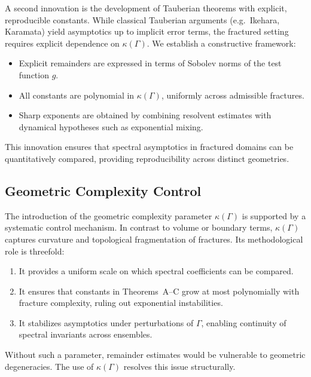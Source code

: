 A second innovation is the development of Tauberian theorems with explicit,
reproducible constants. While classical Tauberian arguments (e.g.\ Ikehara,
Karamata) yield asymptotics up to implicit error terms, the fractured setting
requires explicit dependence on $\kappa(\Gamma)$. We establish a constructive
framework:

\begin{itemize}
  \item Explicit remainders are expressed in terms of Sobolev norms of the test
  function $g$.
  \item All constants are polynomial in $\kappa(\Gamma)$, uniformly across
  admissible fractures.
  \item Sharp exponents are obtained by combining resolvent estimates with
  dynamical hypotheses such as exponential mixing.
\end{itemize}

This innovation ensures that spectral asymptotics in fractured domains can be
quantitatively compared, providing reproducibility across distinct geometries.

\subsection{Geometric Complexity Control}

The introduction of the geometric complexity parameter $\kappa(\Gamma)$ is
supported by a systematic control mechanism. In contrast to volume or boundary
terms, $\kappa(\Gamma)$ captures curvature and topological fragmentation of
fractures. Its methodological role is threefold:

\begin{enumerate}
  \item It provides a uniform scale on which spectral coefficients can be
  compared.
  \item It ensures that constants in Theorems~A--C grow at most polynomially
  with fracture complexity, ruling out exponential instabilities.
  \item It stabilizes asymptotics under perturbations of $\Gamma$, enabling
  continuity of spectral invariants across ensembles.
\end{enumerate}

Without such a parameter, remainder estimates would be vulnerable to geometric
degeneracies. The use of $\kappa(\Gamma)$ resolves this issue structurally.

